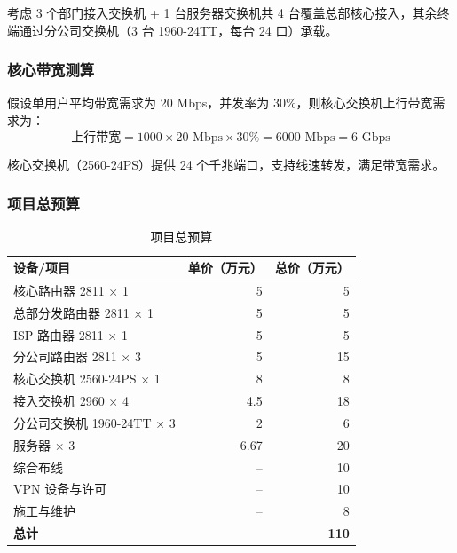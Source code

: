 \documentclass[12pt,a4paper]{ctexart}
\begin{document}
考虑 3 个部门接入交换机 + 1 台服务器交换机共 4 台覆盖总部核心接入，其余终端通过分公司交换机（3 台 1960-24TT，每台 24 口）承载。

\subsubsection{核心带宽测算}

假设单用户平均带宽需求为 20 Mbps，并发率为 30\%，则核心交换机上行带宽需求为：
\[
\text{上行带宽} = 1000 \times 20\text{ Mbps} \times 30\% = 6000\text{ Mbps} = 6\text{ Gbps}
\]

核心交换机（2560-24PS）提供 24 个千兆端口，支持线速转发，满足带宽需求。

\subsubsection{项目总预算}

\begin{table}[H]
\centering
\caption{项目总预算}
\begin{tabular}{|l|r|r|}
\hline
\textbf{设备/项目}       & \textbf{单价（万元）} & \textbf{总价（万元）} \\ \hline
核心路由器 2811 × 1      & 5                     & 5                     \\ \hline
总部分发路由器 2811 × 1  & 5                     & 5                     \\ \hline
ISP 路由器 2811 × 1      & 5                     & 5                     \\ \hline
分公司路由器 2811 × 3    & 5                     & 15                    \\ \hline
核心交换机 2560-24PS × 1 & 8                     & 8                     \\ \hline
接入交换机 2960 × 4      & 4.5                   & 18                    \\ \hline
分公司交换机 1960-24TT × 3 & 2                   & 6                     \\ \hline
服务器 × 3               & 6.67                  & 20                    \\ \hline
综合布线                  & --                    & 10                    \\ \hline
VPN 设备与许可            & --                    & 10                    \\ \hline
施工与维护                & --                    & 8                     \\ \hline
\textbf{总计}            &                       & \textbf{110}          \\ \hline
\end{tabular}
\end{table}
\end{document}
